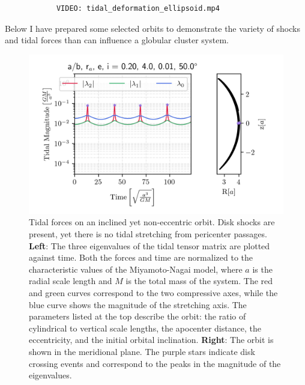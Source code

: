             \begin{verbatim}
            VIDEO: tidal_deformation_ellipsoid.mp4
            \end{verbatim}

            Below I have prepared some selected orbits to demonstrate the variety of shocks and tidal forces than can influence a globular cluster system. 
            
            \begin{figure}
                \includegraphics[width=\linewidth]{images/miyamoto_disc_shocks_ab_rp_e_i_0.20_4.0_0.01_50.0.png}
                \caption{Tidal forces on an inclined yet non-eccentric orbit. Disk shocks are present, yet there is no tidal stretching from pericenter passages. \textbf{Left}: The three eigenvalues of the tidal tensor matrix are plotted against time. Both the forces and time are normalized to the characteristic values of the Miyamoto-Nagai model, where $a$ is the radial scale length and $M$ is the total mass of the system. The red and green curves correspond to the two compressive axes, while the blue curve shows the magnitude of the stretching axis. The parameters listed at the top describe the orbit: the ratio of cylindrical to vertical scale lengths, the apocenter distance, the eccentricity, and the initial orbital inclination. \textbf{Right}: The orbit is shown in the meridional plane. The purple stars indicate disk crossing events and correspond to the peaks in the magnitude of the eigenvalues. }
                \label{fig:miyamoto_disc_shocks_circular_inclined_orbit}
            \end{figure}


